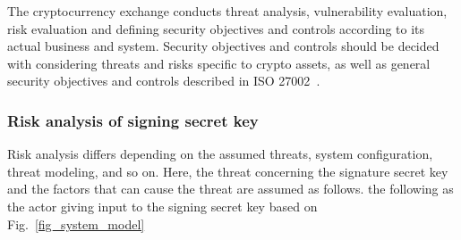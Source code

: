 The cryptocurrency exchange conducts threat analysis, vulnerability evaluation, risk evaluation and defining security objectives and controls according to its actual business and system. Security objectives and controls should be decided with considering threats and risks specific to crypto assets, as well as general security objectives and controls described in ISO 27002~\cite{ISO27002}.

\subsubsection{Risk analysis of signing secret key}
Risk analysis differs depending on the assumed threats, system
configuration, threat modeling, and so on.
Here,
the threat concerning the signature secret key and the factors that
can cause the threat are assumed as follows.
the following as the actor giving input to the signing secret key
based on Fig.~\ref{fig_system_model}%

